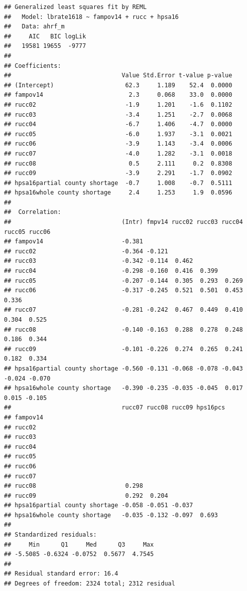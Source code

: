 \documentclass[
]{article}
\begin{document}
\begin{verbatim}
## Generalized least squares fit by REML
##   Model: lbrate1618 ~ fampov14 + rucc + hpsa16 
##   Data: ahrf_m 
##     AIC   BIC logLik
##   19581 19655  -9777
## 
## Coefficients:
##                               Value Std.Error t-value p-value
## (Intercept)                    62.3     1.189    52.4  0.0000
## fampov14                        2.3     0.068    33.0  0.0000
## rucc02                         -1.9     1.201    -1.6  0.1102
## rucc03                         -3.4     1.251    -2.7  0.0068
## rucc04                         -6.7     1.406    -4.7  0.0000
## rucc05                         -6.0     1.937    -3.1  0.0021
## rucc06                         -3.9     1.143    -3.4  0.0006
## rucc07                         -4.0     1.282    -3.1  0.0018
## rucc08                          0.5     2.111     0.2  0.8308
## rucc09                         -3.9     2.291    -1.7  0.0902
## hpsa16partial county shortage  -0.7     1.008    -0.7  0.5111
## hpsa16whole county shortage     2.4     1.253     1.9  0.0596
## 
##  Correlation: 
##                               (Intr) fmpv14 rucc02 rucc03 rucc04 rucc05 rucc06
## fampov14                      -0.381                                          
## rucc02                        -0.364 -0.121                                   
## rucc03                        -0.342 -0.114  0.462                            
## rucc04                        -0.298 -0.160  0.416  0.399                     
## rucc05                        -0.207 -0.144  0.305  0.293  0.269              
## rucc06                        -0.317 -0.245  0.521  0.501  0.453  0.336       
## rucc07                        -0.281 -0.242  0.467  0.449  0.410  0.304  0.525
## rucc08                        -0.140 -0.163  0.288  0.278  0.248  0.186  0.344
## rucc09                        -0.101 -0.226  0.274  0.265  0.241  0.182  0.334
## hpsa16partial county shortage -0.560 -0.131 -0.068 -0.078 -0.043 -0.024 -0.070
## hpsa16whole county shortage   -0.390 -0.235 -0.035 -0.045  0.017  0.015 -0.105
##                               rucc07 rucc08 rucc09 hps16pcs
## fampov14                                                   
## rucc02                                                     
## rucc03                                                     
## rucc04                                                     
## rucc05                                                     
## rucc06                                                     
## rucc07                                                     
## rucc08                         0.298                       
## rucc09                         0.292  0.204                
## hpsa16partial county shortage -0.058 -0.051 -0.037         
## hpsa16whole county shortage   -0.035 -0.132 -0.097  0.693  
## 
## Standardized residuals:
##     Min      Q1     Med      Q3     Max 
## -5.5085 -0.6324 -0.0752  0.5677  4.7545 
## 
## Residual standard error: 16.4 
## Degrees of freedom: 2324 total; 2312 residual
\end{verbatim}
\end{document}
